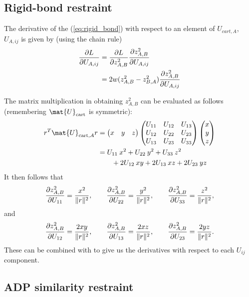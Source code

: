 \documentclass[pdf]{iucr}
\begin{document}
\subsection{Rigid-bond restraint}

The derivative of the (\ref{eq:rigid_bond}) with respect to an element of $U_{cart,A}$,
$U_{A,ij}$ is given by (using the chain rule)
\begin{align}
\frac{\partial L}{\partial U_{A,ij}} &= \frac{\partial L}{\partial z^2_{A,B}} \frac{\partial z^2_{A,B}}{\partial U_{A,ij}}\\
&=2w(z^2_{A,B} - z^2_{B,A}) \frac{\partial z^2_{A,B}}{\partial U_{A,ij}}\label{eqn:u_derivative}
\end{align}

The matrix multiplication in obtaining $z^2_{A,B}$ can be evaluated as follows
(remembering $\mat{U}_{\text{cart}}$ is symmetric):
\begin{align}
r^T\mat{U}_{\text{cart},A}r &= 
\begin{pmatrix} x & y & z \end{pmatrix}
\begin{pmatrix} U_{11} & U_{12} & U_{13}\\
  U_{12} & U_{22} & U_{23}\\
  U_{13} & U_{23} & U_{33}\end{pmatrix}
\begin{pmatrix} x\\y\\z\end{pmatrix}\\
&= U_{11}\: x^2 + U_{22}\: y^2 + U_{33}\: z^2 \nonumber \\
&\qquad  + 2U_{12}\: xy + 2U_{13}\: xz + 2U_{23}\: yz
\end{align}
It then follows that
\begin{equation}
\frac{\partial z^2_{A,B}}{\partial U_{11}} = \frac{x^2}{\| r \|^2} ,\qquad
\frac{\partial z^2_{A,B}}{\partial U_{22}} = \frac{y^2}{\| r \|^2} ,\qquad
\frac{\partial z^2_{A,B}}{\partial U_{33}} = \frac{z^2}{\| r \|^2} ,
\end{equation}
and
\begin{equation}
\frac{\partial z^2_{A,B}}{\partial U_{12}} = \frac{2xy}{\| r \|^2} ,\qquad
\frac{\partial z^2_{A,B}}{\partial U_{13}} = \frac{2xz}{\| r \|^2} ,\qquad
\frac{\partial z^2_{A,B}}{\partial U_{23}} = \frac{2yz}{\| r \|^2} .
\end{equation}
These can be combined with  to give us the derivatives
with respect to each $U_{ij}$ component.


\subsection{ADP similarity restraint}
\end{document}
